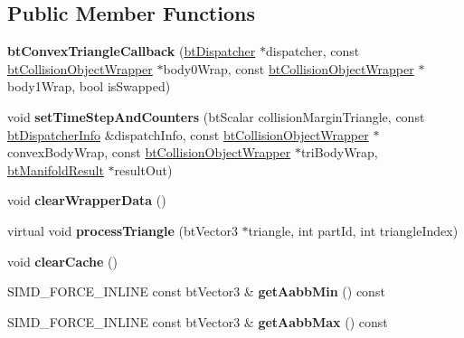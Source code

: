 \subsection*{Public Member Functions}
\begin{DoxyCompactItemize}
\item 
\hypertarget{classbt_convex_triangle_callback_a6f4ecb0523e0400fa311a166ef44d615}{{\bfseries bt\+Convex\+Triangle\+Callback} (\hyperlink{classbt_dispatcher}{bt\+Dispatcher} $\ast$dispatcher, const \hyperlink{structbt_collision_object_wrapper}{bt\+Collision\+Object\+Wrapper} $\ast$body0\+Wrap, const \hyperlink{structbt_collision_object_wrapper}{bt\+Collision\+Object\+Wrapper} $\ast$body1\+Wrap, bool is\+Swapped)}\label{classbt_convex_triangle_callback_a6f4ecb0523e0400fa311a166ef44d615}

\item 
\hypertarget{classbt_convex_triangle_callback_aa1deb837a2ff8a42f7f26f49194879ae}{void {\bfseries set\+Time\+Step\+And\+Counters} (bt\+Scalar collision\+Margin\+Triangle, const \hyperlink{structbt_dispatcher_info}{bt\+Dispatcher\+Info} \&dispatch\+Info, const \hyperlink{structbt_collision_object_wrapper}{bt\+Collision\+Object\+Wrapper} $\ast$convex\+Body\+Wrap, const \hyperlink{structbt_collision_object_wrapper}{bt\+Collision\+Object\+Wrapper} $\ast$tri\+Body\+Wrap, \hyperlink{classbt_manifold_result}{bt\+Manifold\+Result} $\ast$result\+Out)}\label{classbt_convex_triangle_callback_aa1deb837a2ff8a42f7f26f49194879ae}

\item 
\hypertarget{classbt_convex_triangle_callback_ae89fd9d19380ccb4c9d76607027345dd}{void {\bfseries clear\+Wrapper\+Data} ()}\label{classbt_convex_triangle_callback_ae89fd9d19380ccb4c9d76607027345dd}

\item 
\hypertarget{classbt_convex_triangle_callback_a876455c6c0e579ab602d34790ce79260}{virtual void {\bfseries process\+Triangle} (bt\+Vector3 $\ast$triangle, int part\+Id, int triangle\+Index)}\label{classbt_convex_triangle_callback_a876455c6c0e579ab602d34790ce79260}

\item 
\hypertarget{classbt_convex_triangle_callback_a881f3c19fa5af5a2bc2aa298c7b18d25}{void {\bfseries clear\+Cache} ()}\label{classbt_convex_triangle_callback_a881f3c19fa5af5a2bc2aa298c7b18d25}

\item 
\hypertarget{classbt_convex_triangle_callback_ad7584d4f9c5ad5155a86fea6832e862e}{S\+I\+M\+D\+\_\+\+F\+O\+R\+C\+E\+\_\+\+I\+N\+L\+I\+N\+E const bt\+Vector3 \& {\bfseries get\+Aabb\+Min} () const }\label{classbt_convex_triangle_callback_ad7584d4f9c5ad5155a86fea6832e862e}

\item 
\hypertarget{classbt_convex_triangle_callback_ae9961d23b6bec4a69110770376e7e95b}{S\+I\+M\+D\+\_\+\+F\+O\+R\+C\+E\+\_\+\+I\+N\+L\+I\+N\+E const bt\+Vector3 \& {\bfseries get\+Aabb\+Max} () const }\label{classbt_convex_triangle_callback_ae9961d23b6bec4a69110770376e7e95b}

\end{DoxyCompactItemize}
